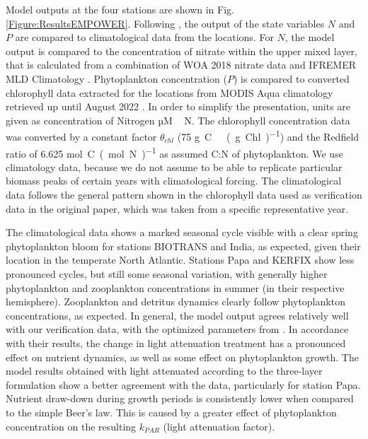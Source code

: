 \documentclass[journal abbreviation, manuscript]{copernicus}
\begin{document}
Model outputs at the four stations are shown in Fig. \ref{Figure:ResultsEMPOWER}. Following \citet{Anderson2015c}, the output of the state variables $N$ and $P$ are compared to climatological data from the locations. For $N$, the model output is compared to the concentration of nitrate within the upper mixed layer, that is calculated from a combination of WOA 2018 nitrate data \citep{Garcia2019WORLDSilicate} and IFREMER MLD Climatology \citep{DeBoyerMontegut2004}. Phytoplankton concentration ($P$) is compared to converted chlorophyll data extracted for the locations from MODIS Aqua climatology retrieved up until August 2022 \citep{NASAGoddardSpaceFlightCenterOceanEcologyLaboratoryOceanBiologyProcessingGroup}. In order to simplify the presentation, units are given as concentration of Nitrogen \unit{µM\,N}. The chlorophyll concentration data was converted by a constant factor $\theta_{chl}$ (75 \unit{g C \ (g Chl)^{−1}}) and the Redfield ratio of 6.625 \unit{mol C (mol N)^{-1}} as assumed C:N of phytoplankton. We use climatology data, because we do not assume to be able to replicate particular biomass peaks of certain years with climatological forcing. The climatological data follows the general pattern shown in the chlorophyll data used as verification data in the original paper, which was taken from a specific representative year.

The climatological data shows a marked seasonal cycle visible with a clear spring phytoplankton bloom for stations BIOTRANS and India, as expected, given their location in the temperate North Atlantic. Stations Papa and KERFIX show less pronounced cycles, but still some seasonal variation, with generally higher phytoplankton and zooplankton concentrations in summer (in their respective hemisphere). Zooplankton and detritus dynamics clearly follow phytoplankton concentrations, as expected.
In general, the model output agrees relatively well with our verification data, with the optimized parameters from \citet{Anderson2015c}. In accordance with their results, the change in light attenuation treatment has a pronounced effect on nutrient dynamics, as well as some effect on phytoplankton growth. The model results obtained with light attenuated according to the three-layer formulation show a better agreement with the data, particularly for station Papa. Nutrient draw-down during growth periods is consistently lower when compared to the simple Beer's law. This is caused by a greater effect of phytoplankton concentration on the resulting $k_{PAR}$ (light attenuation factor).
\end{document}
